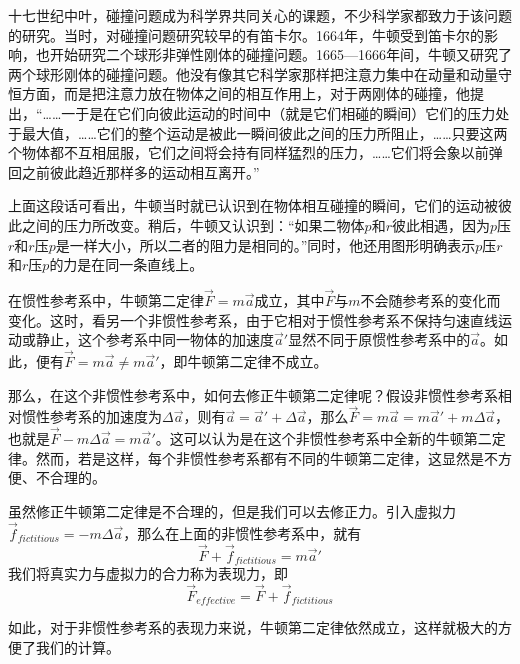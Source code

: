 \begin{prove}
    十七世纪中叶，碰撞问题成为科学界共同关心的课题，不少科学家都致力于该问题的研究。当时，对碰撞问题研究较早的有笛卡尔。1664年，牛顿受到笛卡尔的影响，也开始研究二个球形非弹性刚体的碰撞问题。1665—1666年间，牛顿又研究了两个球形刚体的碰撞问题。他没有像其它科学家那样把注意力集中在动量和动量守恒方面，而是把注意力放在物体之间的相互作用上，对于两刚体的碰撞，他提出，“……一于是在它们向彼此运动的时间中（就是它们相碰的瞬间）它们的压力处于最大值，……它们的整个运动是被此一瞬间彼此之间的压力所阻止，……只要这两个物体都不互相屈服，它们之间将会持有同样猛烈的压力，……它们将会象以前弹回之前彼此趋近那样多的运动相互离开。”

    上面这段话可看出，牛顿当时就已认识到在物体相互碰撞的瞬间，它们的运动被彼此之间的压力所改变。稍后，牛顿又认识到：“如果二物体$p$和$r$彼此相遇，因为$p$压$r$和$r$压$p$是一样大小，所以二者的阻力是相同的。”同时，他还用图形明确表示$p$压$r$和$r$压$p$的力是在同一条直线上。
\end{prove}
\begin{prove}
    在惯性参考系中，牛顿第二定律$\vec{F}=m\vec{a}$成立，其中$\vec{F}$与$m$不会随参考系的变化而变化。这时，看另一个非惯性参考系，由于它相对于惯性参考系不保持匀速直线运动或静止，这个参考系中同一物体的加速度$\vec{a}'$显然不同于原惯性参考系中的$\vec{a}$。如此，便有$\vec{F}=m\vec{a}\ne m\vec{a}'$，即牛顿第二定律不成立。

    那么，在这个非惯性参考系中，如何去修正牛顿第二定律呢？假设非惯性参考系相对惯性参考系的加速度为$\Delta \vec{a}$，则有$\vec{a}=\vec{a}'+\Delta \vec{a}$，那么$\vec{F}=m\vec{a}=m\vec{a}'+m\Delta \vec{a}$，也就是$\vec{F}-m\Delta \vec{a}=m\vec{a}'$。这可以认为是在这个非惯性参考系中全新的牛顿第二定律。然而，若是这样，每个非惯性参考系都有不同的牛顿第二定律，这显然是不方便、不合理的。

    虽然修正牛顿第二定律是不合理的，但是我们可以去修正力。引入虚拟力$\vec{f}_{fictitious}=-m\Delta \vec{a}$，那么在上面的非惯性参考系中，就有
    \[\vec{F}+\vec{f}_{fictitious}=m\vec{a}'\]
    我们将真实力与虚拟力的合力称为表现力，即
    \[\vec{F}_{effective}=\vec{F}+\vec{f}_{fictitious}\]

    如此，对于非惯性参考系的表现力来说，牛顿第二定律依然成立，这样就极大的方便了我们的计算。
\end{prove}
